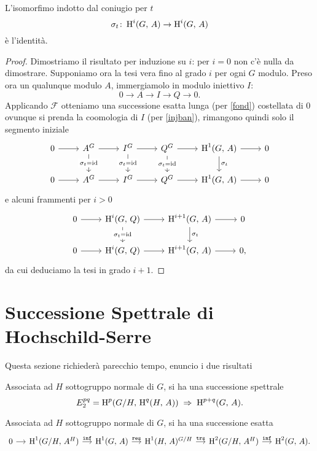 \begin{proposition}
	L'isomorfimo indotto dal coniugio per $ t $
	\[ \sigma_t \colon \operatorname{H}^i(G, \, A) \to \operatorname{H}^i(G, \, A) \]
	è l'identità.
\end{proposition}
\begin{proof}
	Dimostriamo il risultato per induzione su $ i $: per $ i = 0 $ non c'è nulla da dimostrare. Supponiamo ora la tesi vera fino al grado $ i $ per ogni $ G $ modulo. Preso ora un qualunque modulo $ A $, immergiamolo in modulo iniettivo $ I $:
	\[ 0 \to A \to I \to Q \to 0. \]
	Applicando $ \mathcal{F} $ otteniamo una successione esatta lunga (per \ref{fond}) costellata di $ 0 $ ovunque si prenda la coomologia di $ I $ (per \ref{injban}), rimangono quindi solo il segmento iniziale
	\[\begin{tikzcd}
	0 \rar & A^G \rar\dar["\sigma_t = \id" description] & I^G \rar\dar["\sigma_t = \id" description] & Q^G \rar\dar["\sigma_t = \id" description] & \HH^1(G, \, A) \rar\dar["\sigma_t"] & 0 \\
	0 \rar & A^G \rar & I^G \rar & Q^G \rar & \HH^1(G, \, A) \rar & 0
	\end{tikzcd}\]
	e alcuni frammenti per $ i > 0 $
	\[\begin{tikzcd}
	0 \rar & \HH^i(G, \, Q) \rar\dar["\sigma_t = \id" description] & \HH^{i+1}(G, \, A) \rar\dar["\sigma_t"] & 0 \\
	0 \rar & \HH^i(G, \, Q) \rar & \HH^{i+1}(G, \, A) \rar & 0,
	\end{tikzcd}\]
	da cui deduciamo la tesi in grado $ i+1 $.
\end{proof}
\newpage
\section{Successione Spettrale di Hochschild-Serre}

Questa sezione richiederà parecchio tempo, enuncio i due risultati

\begin{theorem}
	Associata ad $ H $ sottogruppo normale di $ G $, si ha una successione spettrale
	\[ E^{pq}_2 = \operatorname{H}^p(G/H, \, \operatorname{H}^q(H, \, A)) \;\Rightarrow\; \operatorname{H}^{p+q}(G, \, A). \]
	
\end{theorem}

\begin{corollary}
	Associata ad $ H $ sottogruppo normale di $ G $, si ha una successione esatta
	\[\begin{tikzcd}[column sep = small]
	0 \rar & \HH^1(G/H, \, A^H) \rar["\Inf"]
	& \HH^1(G, \, A) \rar["\Res"]
	& \HH^1(H, \, A)^{G/H} \rar["\texttt{trs}"]
	& \HH^2(G/H, \, A^H) \rar["\Inf"]
	& \HH^2(G, \, A).
	\end{tikzcd} \]
\end{corollary}

